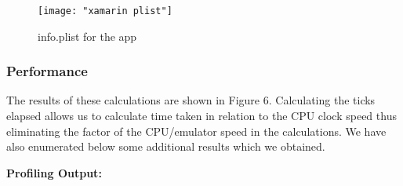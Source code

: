 \documentclass[12pt,a4paper]{article}
\begin{document}
	\begin{figure}
	    \centering
	    \texttt{[image: "xamarin plist"]}
	    \caption{info.plist for the app}
	\end{figure}
	
	\subsubsection{Performance}
	
	The results of these calculations are shown in Figure 6. Calculating the ticks elapsed allows us to calculate time taken in relation to the CPU clock speed thus eliminating the factor of the CPU/emulator speed in the calculations. We have also enumerated below some additional results which we obtained.
	
	\textbf{Profiling Output:}
	
\end{document}

